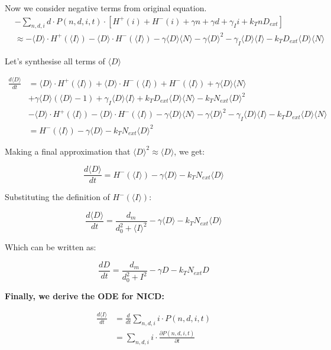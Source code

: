 \documentclass{article}
\begin{document}
\begin{flushleft}
Now we consider negative terms from original equation.
\begin{align*}
&-\sum_{n,d,i} d \cdot P(n,d,i,t) \cdot [H^+(i) + H^-(i) + \gamma n + \gamma d + \gamma_I i + k_T n D_{ext}] \\
&\approx -\langle D \rangle \cdot H^+(\langle I \rangle) - \langle D \rangle \cdot H^-(\langle I \rangle) - \gamma \langle D \rangle \langle N \rangle - \gamma \langle D \rangle^2 - \gamma_I \langle D \rangle \langle I \rangle - k_T D_{ext} \langle D \rangle \langle N \rangle
\end{align*}

Let's synthesise all terms of $\langle D \rangle$

\begin{align*}
\frac{d\langle D \rangle}{dt} &= \langle D \rangle \cdot H^+(\langle I \rangle) + \langle D \rangle \cdot H^-(\langle I \rangle) + H^-(\langle I \rangle) + \gamma \langle D \rangle \langle N \rangle \\
&+ \gamma \langle D \rangle (\langle D \rangle - 1) + \gamma_I \langle D \rangle \langle I \rangle + k_T D_{ext} \langle D \rangle \langle N \rangle - k_T N_{ext} \langle D \rangle^2 \\
&- \langle D \rangle \cdot H^+(\langle I \rangle) - \langle D \rangle \cdot H^-(\langle I \rangle) - \gamma \langle D \rangle \langle N \rangle - \gamma \langle D \rangle^2 - \gamma_I \langle D \rangle \langle I \rangle - k_T D_{ext} \langle D \rangle \langle N \rangle \\
&= H^-(\langle I \rangle) - \gamma \langle D \rangle - k_T N_{ext} \langle D \rangle^2
\end{align*}

Making a final approximation that $\langle D \rangle^2 \approx \langle D \rangle$, we get:

\[
\frac{d\langle D \rangle}{dt} = H^-(\langle I \rangle) - \gamma \langle D \rangle - k_T N_{ext} \langle D \rangle
\]

Substituting the definition of $H^-(\langle I \rangle)$:

\[
\frac{d\langle D \rangle}{dt} = \frac{d_m}{d_0^2 + \langle I \rangle^2} - \gamma \langle D \rangle - k_T N_{ext} \langle D \rangle
\]

Which can be written as:

\[
\frac{dD}{dt} = \frac{d_m}{d_0^2 + I^2} - \gamma D - k_T N_{ext} D
\]

\textbf{Finally, we derive the ODE for NICD:}

\begin{align*}
\frac{d\langle I \rangle}{dt} &= \frac{d}{dt}\sum_{n,d,i} i \cdot P(n,d,i,t) \\
&= \sum_{n,d,i} i \cdot \frac{\partial P(n,d,i,t)}{\partial t}
\end{align*}


\end{flushleft}
\end{document}
